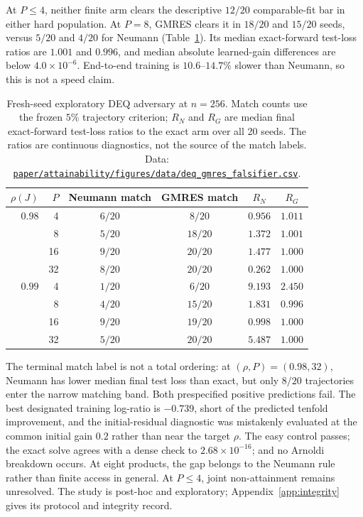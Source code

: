 At $P\leq4$, neither finite arm clears the descriptive $12/20$ comparable-fit
bar in either hard population. At $P=8$, GMRES clears it in $18/20$ and $15/20$
seeds, versus $5/20$ and $4/20$ for Neumann (Table~\ref{tab:deq-gmres}). Its
median exact-forward test-loss ratios are $1.001$ and $0.996$, and median
absolute learned-gain differences are below $4.0\times10^{-6}$. End-to-end
training is $10.6$--$14.7\%$ slower than Neumann, so this is not a speed claim.

\begin{table}[htbp]
  \centering
  \caption{Fresh-seed exploratory DEQ adversary at $n=256$. Match counts use
  the frozen $5\%$ trajectory criterion; $R_N$ and $R_G$ are median final
  exact-forward test-loss ratios to the exact arm over all 20 seeds. The
  ratios are continuous diagnostics, not the source of the match labels.
  Data: \href{https://github.com/vanshsehrawat14/gabp-sparse-inv/blob/main/paper/attainability/figures/data/deq_gmres_falsifier.csv}
{\nolinkurl{paper/attainability/figures/data/deq_gmres_falsifier.csv}}.}
  \label{tab:deq-gmres}
  \begin{tabular}{rrcccc}
    \toprule
    $\rho(J)$ & $P$ & Neumann match & GMRES match & $R_N$ & $R_G$ \\
    \midrule
    $0.98$ & 4  & $6/20$ & $8/20$  & $0.956$ & $1.011$ \\
           & 8  & $5/20$ & $18/20$ & $1.372$ & $1.001$ \\
           & 16 & $9/20$ & $20/20$ & $1.477$ & $1.000$ \\
           & 32 & $8/20$ & $20/20$ & $0.262$ & $1.000$ \\
    $0.99$ & 4  & $1/20$ & $6/20$  & $9.193$ & $2.450$ \\
           & 8  & $4/20$ & $15/20$ & $1.831$ & $0.996$ \\
           & 16 & $9/20$ & $19/20$ & $0.998$ & $1.000$ \\
           & 32 & $5/20$ & $20/20$ & $5.487$ & $1.000$ \\
    \bottomrule
  \end{tabular}
\end{table}

The terminal match label is not a total ordering: at $(\rho,P)=(0.98,32)$,
Neumann has lower median final test loss than exact, but only $8/20$
trajectories enter the narrow matching band. Both prespecified positive
predictions fail. The best designated training log-ratio is $-0.739$, short of
the predicted tenfold improvement, and the initial-residual diagnostic was
mistakenly evaluated at the common initial gain $0.2$ rather than near the
target $\rho$. The easy control passes; the exact solve agrees with a dense
check to $2.68\times10^{-16}$; and no Arnoldi breakdown occurs. At eight
products, the gap belongs to the Neumann rule rather than finite access in
general. At $P\leq4$, joint non-attainment remains unresolved. The study is
post-hoc and exploratory; Appendix~\ref{app:integrity} gives its protocol and
integrity record.

